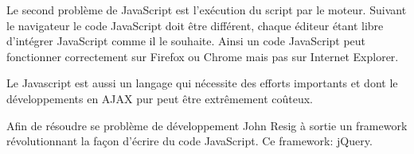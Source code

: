 Le second problème de JavaScript est l'exécution du script par le moteur. Suivant le navigateur le code JavaScript doit être différent, chaque éditeur étant libre d’intégrer JavaScript comme il le souhaite. Ainsi un code JavaScript peut fonctionner correctement sur Firefox ou Chrome mais pas sur Internet Explorer.

Le Javascript est aussi un langage qui nécessite des efforts importants et dont le développements en AJAX pur peut être extrêmement coûteux.

Afin de résoudre se problème de développement  John Resig à sortie un framework révolutionnant la façon d’écrire du code JavaScript. Ce framework: jQuery.

